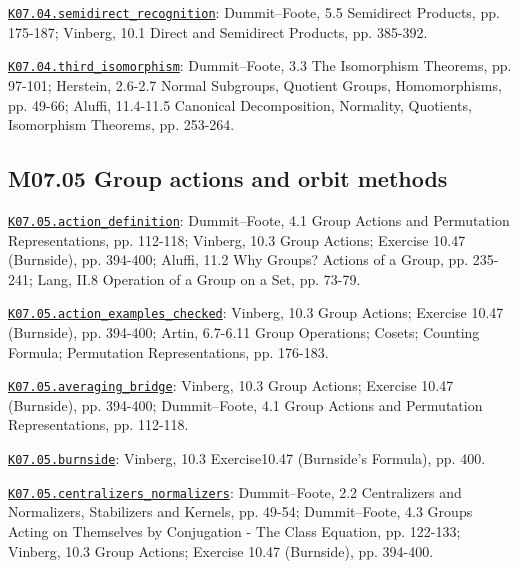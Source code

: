 \par\smallskip\noindent\hypertarget{src:K07.04.semidirect_recognition}{}\label{src:K07.04.semidirect_recognition}\hyperref[K07.04.semidirect_recognition]{\texttt{K07.04.semidirect\_recognition}}: Dummit--Foote, 5.5 Semidirect Products, pp. 175-187; Vinberg, 10.1 Direct and Semidirect Products, pp. 385-392.
\par\smallskip\noindent\hypertarget{src:K07.04.third_isomorphism}{}\label{src:K07.04.third_isomorphism}\hyperref[K07.04.third_isomorphism]{\texttt{K07.04.third\_isomorphism}}: Dummit--Foote, 3.3 The Isomorphism Theorems, pp. 97-101; Herstein, 2.6-2.7 Normal Subgroups, Quotient Groups, Homomorphisms, pp. 49-66; Aluffi, 11.4-11.5 Canonical Decomposition, Normality, Quotients, Isomorphism Theorems, pp. 253-264.
\subsection*{M07.05 Group actions and orbit methods}
\par\smallskip\noindent\hypertarget{src:K07.05.action_definition}{}\label{src:K07.05.action_definition}\hyperref[K07.05.action_definition]{\texttt{K07.05.action\_definition}}: Dummit--Foote, 4.1 Group Actions and Permutation Representations, pp. 112-118; Vinberg, 10.3 Group Actions; Exercise 10.47 (Burnside), pp. 394-400; Aluffi, 11.2 Why Groups? Actions of a Group, pp. 235-241; Lang, II.8 Operation of a Group on a Set, pp. 73-79.
\par\smallskip\noindent\hypertarget{src:K07.05.action_examples_checked}{}\label{src:K07.05.action_examples_checked}\hyperref[K07.05.action_examples_checked]{\texttt{K07.05.action\_examples\_checked}}: Vinberg, 10.3 Group Actions; Exercise 10.47 (Burnside), pp. 394-400; Artin, 6.7-6.11 Group Operations; Cosets; Counting Formula; Permutation Representations, pp. 176-183.
\par\smallskip\noindent\hypertarget{src:K07.05.averaging_bridge}{}\label{src:K07.05.averaging_bridge}\hyperref[K07.05.averaging_bridge]{\texttt{K07.05.averaging\_bridge}}: Vinberg, 10.3 Group Actions; Exercise 10.47 (Burnside), pp. 394-400; Dummit--Foote, 4.1 Group Actions and Permutation Representations, pp. 112-118.
\par\smallskip\noindent\hypertarget{src:K07.05.burnside}{}\label{src:K07.05.burnside}\hyperref[K07.05.burnside]{\texttt{K07.05.burnside}}: Vinberg, 10.3 Exercise10.47 (Burnside's Formula), pp. 400.
\par\smallskip\noindent\hypertarget{src:K07.05.centralizers_normalizers}{}\label{src:K07.05.centralizers_normalizers}\hyperref[K07.05.centralizers_normalizers]{\texttt{K07.05.centralizers\_normalizers}}: Dummit--Foote, 2.2 Centralizers and Normalizers, Stabilizers and Kernels, pp. 49-54; Dummit--Foote, 4.3 Groups Acting on Themselves by Conjugation - The Class Equation, pp. 122-133; Vinberg, 10.3 Group Actions; Exercise 10.47 (Burnside), pp. 394-400.
